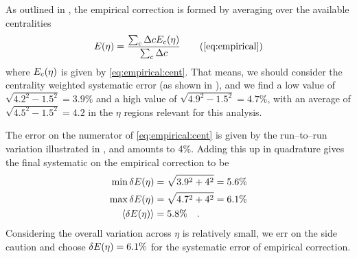 As outlined in , the empirical correction is
formed by averaging over the available centralities 
\begin{equation}
  \EmpCor{} = \frac{\sum_c \Delta c\EmpCor[c]{}}{\sum_c \Delta c}
  \tag{\ref{eq:empirical}}
\end{equation}
where $\EmpCor[c]{}$ is given by \eqref{eq:empirical:cent}.  That
means, we should consider the centrality weighted systematic error (as
shown in ), and we find a low value of
$\sqrt{4.2^2-1.5^2}=3.9\%$ and a high value of
$\sqrt{4.9^2-1.5^2}=4.7\%$, with an average of
$\sqrt{4.5^2-1.5^2}=4.2$ in the $\eta$ regions relevant for this
analysis. 

The error on the numerator of \eqref{eq:empirical:cent} is given by
the run--to--run variation illustrated in
, and amounts to 4\%.  Adding this
up in quadrature gives the final systematic on the empirical
correction to be 
\begin{align}
  \label{eq:empcorr:syserr}
  \min{\delta\EmpCor{}} &= \sqrt{3.9^2+4^2} = 5.6\%\nonumber\\
  \max{\delta\EmpCor{}} &= \sqrt{4.7^2+4^2} = 6.1\%\nonumber\\
  \langle\delta\EmpCor{}\rangle &= 5.8\%\quad.\\
\end{align}
Considering the overall variation across $\eta$ is relatively small,
we err on the side caution and choose $\delta\EmpCor{}=6.1\%$ for the
systematic error of empirical correction. 
